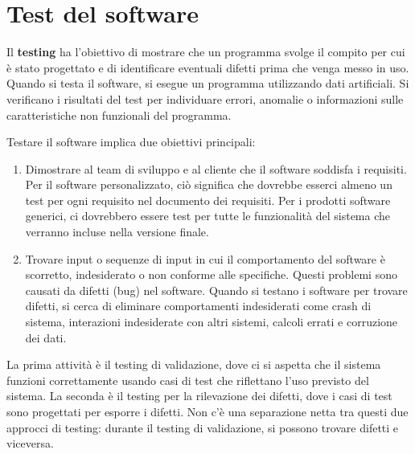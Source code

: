 \chapter{Test del software}
\begin{redbar}
Il \textbf{testing} ha l’obiettivo di mostrare che un programma svolge il compito per cui è stato progettato e di identificare eventuali difetti prima che venga messo in uso. Quando si testa il software, si esegue un programma utilizzando dati artificiali. Si verificano i risultati del test per individuare errori, anomalie o informazioni sulle caratteristiche non funzionali del programma. 
\end{redbar}
Testare il software implica due obiettivi principali:
\begin{enumerate}
    \item Dimostrare al team di sviluppo e al cliente che il software soddisfa i requisiti. Per il software personalizzato, ciò significa che dovrebbe esserci almeno un test per ogni requisito nel documento dei requisiti. Per i prodotti software generici, ci dovrebbero essere test per tutte le funzionalità del sistema che verranno incluse nella versione finale.
    \item Trovare input o sequenze di input in cui il comportamento del software è scorretto, indesiderato o non conforme alle specifiche. Questi problemi sono causati da difetti (bug) nel software. Quando si testano i software per trovare difetti, si cerca di eliminare comportamenti indesiderati come crash di sistema, interazioni indesiderate con altri sistemi, calcoli errati e corruzione dei dati.
\end{enumerate}
La prima attività è il testing di validazione, dove ci si aspetta che il sistema funzioni correttamente usando casi di test che riflettano l’uso previsto del sistema. La seconda è il testing per la rilevazione dei difetti, dove i casi di test sono progettati per esporre i difetti. Non c'è una separazione netta tra questi due approcci di testing: durante il testing di validazione, si possono trovare difetti e viceversa.

